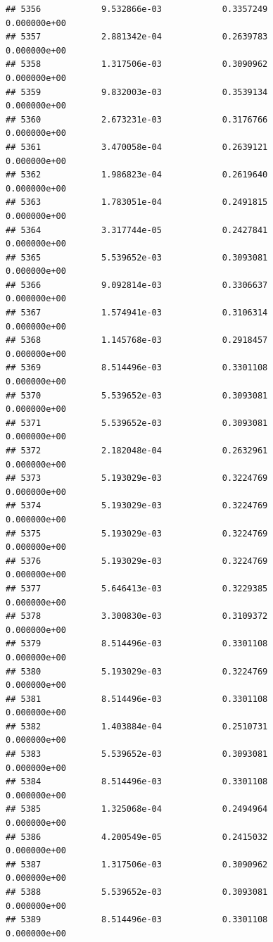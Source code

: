 \documentclass[
]{article}
\begin{document}
\begin{verbatim}
## 5356            9.532866e-03            0.3357249            0.000000e+00
## 5357            2.881342e-04            0.2639783            0.000000e+00
## 5358            1.317506e-03            0.3090962            0.000000e+00
## 5359            9.832003e-03            0.3539134            0.000000e+00
## 5360            2.673231e-03            0.3176766            0.000000e+00
## 5361            3.470058e-04            0.2639121            0.000000e+00
## 5362            1.986823e-04            0.2619640            0.000000e+00
## 5363            1.783051e-04            0.2491815            0.000000e+00
## 5364            3.317744e-05            0.2427841            0.000000e+00
## 5365            5.539652e-03            0.3093081            0.000000e+00
## 5366            9.092814e-03            0.3306637            0.000000e+00
## 5367            1.574941e-03            0.3106314            0.000000e+00
## 5368            1.145768e-03            0.2918457            0.000000e+00
## 5369            8.514496e-03            0.3301108            0.000000e+00
## 5370            5.539652e-03            0.3093081            0.000000e+00
## 5371            5.539652e-03            0.3093081            0.000000e+00
## 5372            2.182048e-04            0.2632961            0.000000e+00
## 5373            5.193029e-03            0.3224769            0.000000e+00
## 5374            5.193029e-03            0.3224769            0.000000e+00
## 5375            5.193029e-03            0.3224769            0.000000e+00
## 5376            5.193029e-03            0.3224769            0.000000e+00
## 5377            5.646413e-03            0.3229385            0.000000e+00
## 5378            3.300830e-03            0.3109372            0.000000e+00
## 5379            8.514496e-03            0.3301108            0.000000e+00
## 5380            5.193029e-03            0.3224769            0.000000e+00
## 5381            8.514496e-03            0.3301108            0.000000e+00
## 5382            1.403884e-04            0.2510731            0.000000e+00
## 5383            5.539652e-03            0.3093081            0.000000e+00
## 5384            8.514496e-03            0.3301108            0.000000e+00
## 5385            1.325068e-04            0.2494964            0.000000e+00
## 5386            4.200549e-05            0.2415032            0.000000e+00
## 5387            1.317506e-03            0.3090962            0.000000e+00
## 5388            5.539652e-03            0.3093081            0.000000e+00
## 5389            8.514496e-03            0.3301108            0.000000e+00

\end{verbatim}
\end{document}
